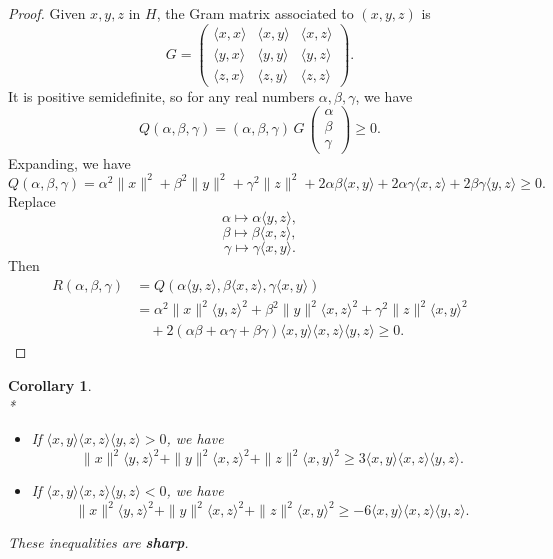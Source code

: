 \documentclass[a4paper,10pt]{article}
\theoremstyle{plain}
\newtheorem{corollary}[theorem]{Corollary}
\theoremstyle{definition}
\theoremstyle{remark}
\begin{document}
\begin{proof}
Given \(x, y, z\) in $H$, the Gram matrix associated to $(x,y,z)$ is  
\[
G = \begin{pmatrix}
\langle x, x \rangle & \langle x, y \rangle & \langle x, z \rangle \\
\langle y, x \rangle & \langle y, y \rangle & \langle y, z \rangle \\
\langle z, x \rangle & \langle z, y \rangle & \langle z, z \rangle
\end{pmatrix}.
\]
It is positive semidefinite, so for any real numbers \(\alpha, \beta, \gamma\), we have  
\[
Q(\alpha, \beta, \gamma) = (\alpha, \beta, \gamma) \, G \, \begin{pmatrix} \alpha \\ \beta \\ \gamma \end{pmatrix} \ge 0.
\]
Expanding, we have
\[
Q(\alpha, \beta, \gamma) =
\alpha^2 \|x\|^2 + \beta^2 \|y\|^2 + \gamma^2 \|z\|^2
+ 2\alpha\beta\langle x, y\rangle + 2\alpha\gamma\langle x, z\rangle + 2\beta\gamma\langle y, z\rangle \geq 0.
\]
Replace
\[
\alpha \mapsto \alpha \langle y, z \rangle,
\]
\[
\beta \mapsto \beta \langle x, z \rangle,
\]
\[
\gamma \mapsto \gamma \langle x, y \rangle.
\]
Then
\begin{align*}
R(\alpha,\beta,\gamma) &= Q(\alpha \langle y, z \rangle, \beta \langle x, z \rangle , \gamma  \langle x, y \rangle) \\
&=  \alpha^2  \|x\|^2 \langle y, z \rangle^2 + \beta^2 \|y\|^2 \langle x, z \rangle^2 + \gamma^2 \|z\|^2 \langle x, y \rangle^2  \\
&\quad + 2  (\alpha\beta + \alpha\gamma + \beta\gamma) \langle x, y\rangle \langle x, z\rangle \langle y, z\rangle \geq 0.
\end{align*}
\end{proof}

\begin{corollary} \mbox{}\\*
\begin{itemize}
\item If $\langle x, y\rangle \langle x, z\rangle \langle y, z\rangle > 0$, we have
\[ \|x\|^2 \langle y, z \rangle^2 + \|y\|^2 \langle x, z \rangle^2 + \|z\|^2 \langle x, y \rangle^2  \geq 3 \langle x, y\rangle \langle x, z\rangle \langle y, z\rangle. \]
\item If $\langle x, y\rangle \langle x, z\rangle \langle y, z\rangle < 0$, we have
\[ \|x\|^2 \langle y, z \rangle^2 + \|y\|^2 \langle x, z \rangle^2 + \|z\|^2 \langle x, y \rangle^2  \geq - 6 \langle x, y\rangle \langle x, z\rangle \langle y, z\rangle.\]
\end{itemize}
These inequalities are \textbf{sharp}.
\end{corollary}
\end{document}
